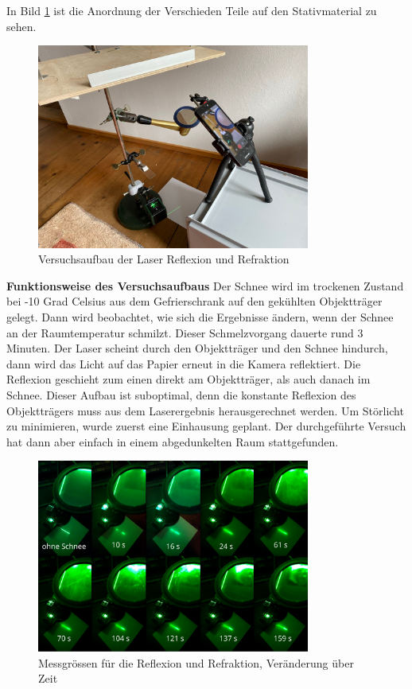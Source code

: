In Bild \ref{fig:LaserAufbau} ist die Anordnung der Verschieden Teile auf den Stativmaterial zu sehen.


\begin{figure}
    \centering
    \includegraphics[width=0.8\textwidth]{Bilder/signal-2024-03-10-112013_006.jpeg}
    \caption{Versuchsaufbau der Laser Reflexion und Refraktion}
    \label{fig:LaserAufbau}
\end{figure}


\textbf{Funktionsweise des Versuchsaufbaus}
Der Schnee wird im trockenen Zustand bei -10 Grad Celsius aus dem Gefrierschrank auf den gekühlten Objektträger gelegt. Dann wird beobachtet, wie sich die Ergebnisse ändern, wenn der Schnee an der Raumtemperatur schmilzt. Dieser Schmelzvorgang dauerte rund 3 Minuten. Der Laser scheint durch den Objektträger und den Schnee hindurch, dann wird das Licht auf das Papier erneut in die Kamera reflektiert. Die Reflexion geschieht zum einen direkt am Objektträger, als auch danach im Schnee. Dieser Aufbau ist suboptimal, denn die konstante Reflexion des Objektträgers muss aus dem Laserergebnis herausgerechnet werden. Um Störlicht zu minimieren, wurde zuerst eine Einhausung geplant. Der durchgeführte Versuch hat dann aber einfach in einem abgedunkelten Raum stattgefunden.


\begin{figure}[h]
    \centering
    \includegraphics[width=0.8\textwidth]{Bilder/Screenshotfrom2024-04-0413-27-28.png}
    \caption{Messgrössen für die Reflexion und Refraktion, Veränderung über Zeit}
    \label{fig:LaserRef}
\end{figure}



